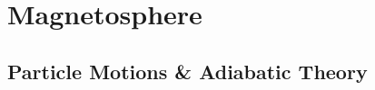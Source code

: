 


\section{Magnetosphere}\label{sec:mag}

\subsection*{Particle Motions \& Adiabatic Theory} \label{sec:plasmadiff}

